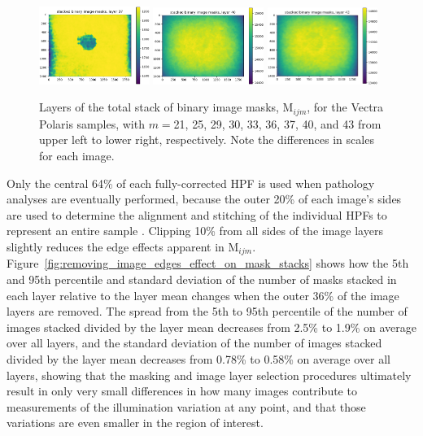 \documentclass[letterpaper,11pt]{article}
\newcommand{\reffig}[1]{Figure~\ref{#1}}
\newcommand{\Mu}{\mathrm{M}}
\begin{document}
\begin{figure}[!ht]
\includegraphics[width=0.32\textwidth]{images/measuring_flatfield_corrections/mask_stack_layers_polaris/mask_stack_layer_37}
\includegraphics[width=0.32\textwidth]{images/measuring_flatfield_corrections/mask_stack_layers_polaris/mask_stack_layer_40}
\includegraphics[width=0.32\textwidth]{images/measuring_flatfield_corrections/mask_stack_layers_polaris/mask_stack_layer_43}
\caption{\footnotesize Layers of the total stack of binary image masks, $\Mu_{ijm}$, for the Vectra Polaris samples, with $m=$21, 25, 29, 30, 33, 36, 37, 40, and 43 from upper left to lower right, respectively. Note the differences in scales for each image.}
\label{fig:mask_stack_layers_polaris_2}
\end{figure}

Only the central 64\% of each fully-corrected HPF is used when pathology analyses are eventually performed, because the outer 20\% of each image's sides are used to determine the alignment and stitching of the individual HPFs to represent an entire sample \cite{Heshy}. Clipping 10\% from all sides of the image layers slightly reduces the edge effects apparent in $\Mu_{ijm}$. \reffig{fig:removing_image_edges_effect_on_mask_stacks} shows how the 5th and 95th percentile and standard deviation of the number of masks stacked in each layer relative to the layer mean changes when the outer 36\% of the image layers are removed. The spread from the 5th to 95th percentile of the number of images stacked divided by the layer mean decreases from 2.5\% to 1.9\% on average over all layers, and the standard deviation of the number of images stacked divided by the layer mean decreases from 0.78\% to 0.58\% on average over all layers, showing that the masking and image layer selection procedures ultimately result in only very small differences in how many images contribute to measurements of the illumination variation at any point, and that those variations are even smaller in the region of interest.
\end{document}

